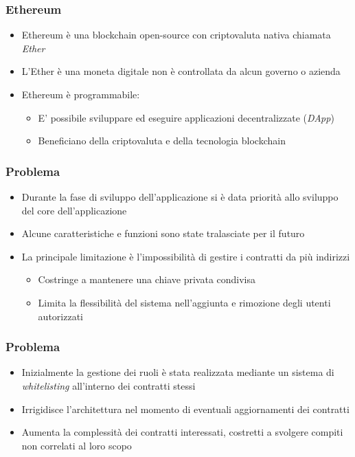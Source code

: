 \documentclass{beamer}
\begin{document}
\begin{frame}
\frametitle{Ethereum}

\begin{itemize}
    \item Ethereum è una blockchain open-source con criptovaluta nativa chiamata \emph{Ether}
    \item L'Ether è una moneta digitale non è controllata da alcun governo o azienda
    \item Ethereum è programmabile:
    \begin{itemize}
        \item E' possibile sviluppare ed eseguire applicazioni decentralizzate (\emph{DApp})
        \item Beneficiano della criptovaluta e della tecnologia blockchain
    \end{itemize}
\end{itemize}

\end{frame}


\begin{frame}
\frametitle{Problema}

\begin{itemize}
    \item Durante la fase di sviluppo dell’applicazione si è data priorità allo sviluppo del core dell’applicazione
    \item Alcune caratteristiche e funzioni sono state tralasciate per il futuro
    \item La principale limitazione è l'impossibilità di gestire i contratti da più indirizzi
    \begin{itemize}
        \item Costringe a mantenere una chiave privata condivisa
        \item Limita la flessibilità del sistema nell'aggiunta e rimozione degli utenti autorizzati
    \end{itemize}
\end{itemize}

\end{frame}


\begin{frame}
\frametitle{Problema}

\begin{itemize}
    \item Inizialmente la gestione dei ruoli è stata realizzata mediante un sistema di \emph{whitelisting} all'interno dei contratti stessi
    \item Irrigidisce l'architettura nel momento di eventuali aggiornamenti dei contratti
    \item Aumenta la complessità dei contratti interessati, costretti a svolgere compiti non correlati al loro scopo
\end{itemize}

\end{frame}
\end{document}
